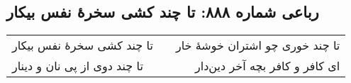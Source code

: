 \begin{center}
\section*{رباعی شماره ۸۸۸: تا چند کشی سخرهٔ نفس بیکار}
\label{sec:0888}
\begin{longtable}{l p{0.5cm} r}
تا چند کشی سخرهٔ نفس بیکار
&&
تا چند خوری چو اشتران خوشهٔ خار
\\
تا چند دوی از پی نان و دینار
&&
ای کافر و کافر بچه آخر دین‌دار
\\
\end{longtable}
\end{center}
